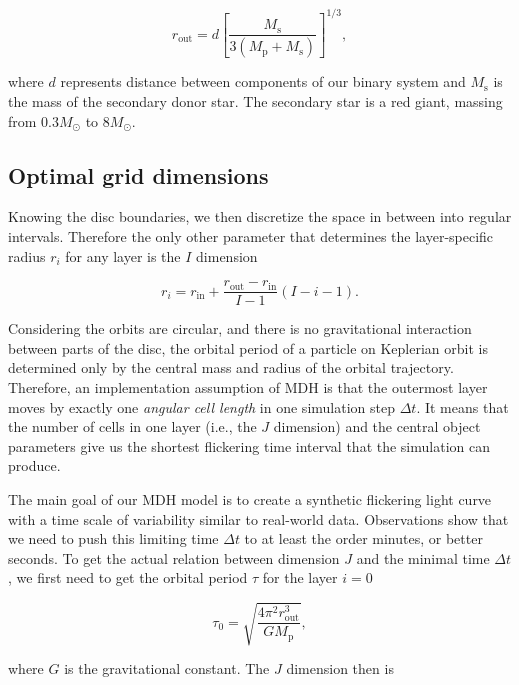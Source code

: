 \begin{equation}
    r_{\text{out}} = d \left[ \frac{M_{\text{s}}}{3 (M_{\text{p}}+M_{\text{s}})} \right]^{1/3},
\end{equation}

where $d$ represents distance between components of our binary system and $M_{\text{s}}$ is the mass of the secondary donor star. The secondary star is a red giant, massing from $0.3M_{\odot}$ to $8M_{\odot}$. 

\subsection{Optimal grid dimensions}

Knowing the disc boundaries, we then discretize the space in between into regular intervals. Therefore the only other parameter that determines the layer-specific radius $r_i$ for any layer is the $I$ dimension

\begin{equation}
    r_i = r_{\text{in}} + \frac{r_{\text{out}} - r_{\text{in}}}{I - 1} (I - i - 1).
\end{equation}

Considering the orbits are circular, and there is no gravitational interaction between parts of the disc, the orbital period of a particle on Keplerian orbit is determined only by the central mass and radius of the orbital trajectory. Therefore, an implementation assumption of MDH is that the outermost layer moves by exactly one \emph{angular cell length} in one simulation step $\Delta t$. It means that the number of cells in one layer (i.e., the $J$ dimension) and the central object parameters give us the shortest flickering time interval that the simulation can produce.

The main goal of our MDH model is to create a synthetic flickering light curve with a time scale of variability similar to real-world data. Observations show that we need to push this limiting time $\Delta t$ to at least the order minutes, or better seconds. To get the actual relation between dimension $J$ and the minimal time $\Delta t$, we first need to get the orbital period $\tau$ for the layer $i=0$

\begin{equation}
    \tau_{0} = \sqrt{\frac{4 \pi^2 r_{\text{out}}^3}{G M_{\text{p}}}},
    \label{eq:outer_layer_tau}
\end{equation}

where $G$ is the gravitational constant. The $J$ dimension then is

